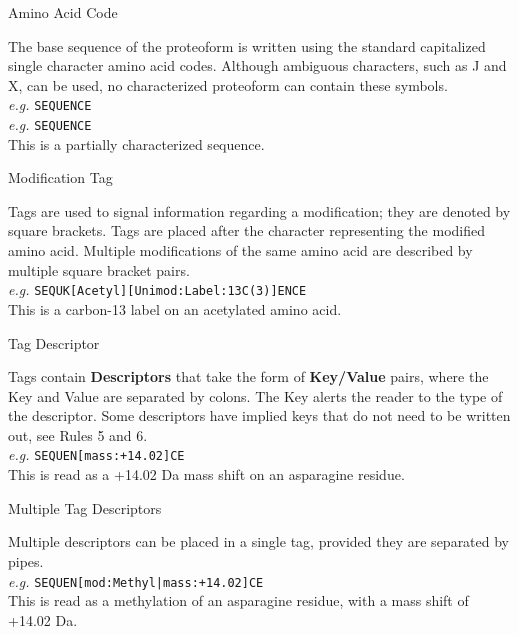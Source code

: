 
\begin{newrule}
Amino Acid Code
\end{newrule}

The base sequence of the proteoform is written using the standard capitalized single character amino acid codes. Although ambiguous characters, such as J and X, can be used, no characterized proteoform can contain these symbols.
\\

\indent \textit{e.g.} \texttt{SEQUENCE} \\
\indent \textit{e.g.} \texttt{SEQUENCE} \\
\indent \indent This is a partially characterized sequence.
\\

\begin{newrule}
Modification Tag
\end{newrule}

Tags are used to signal information regarding a modification; they are denoted by square brackets. Tags are placed after the character representing the modified amino acid. Multiple modifications of the same amino acid are described by multiple square bracket pairs.
\\

\indent \textit{e.g.} \texttt{SEQUK[Acetyl][Unimod:Label:13C(3)]ENCE} \\
\indent \indent This is a carbon-13 label on an acetylated amino acid.
\\

\begin{newrule}
Tag Descriptor
\end{newrule}

Tags contain \textbf{Descriptors} that take the form of \textbf{Key/Value} pairs, where the Key and Value are separated by colons. The Key alerts the reader to the type of the descriptor. Some descriptors have implied keys that do not need to be written out, see Rules 5 and 6.
\\

\indent \textit{e.g.} \texttt{SEQUEN[mass:+14.02]CE} \\
\indent \indent This is read as a +14.02 Da mass shift on an asparagine residue.
\\

\begin{newrule}
Multiple Tag Descriptors
\end{newrule}

Multiple descriptors can be placed in a single tag, provided they are separated by pipes.
\\

\indent \textit{e.g.} \texttt{SEQUEN[mod:Methyl|mass:+14.02]CE} \\
\indent \indent This is read as a methylation of an asparagine residue, with a mass shift of +14.02 Da.
\\